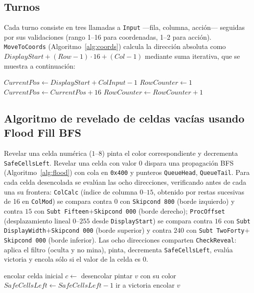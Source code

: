 \documentclass[conference]{IEEEtran}
\begin{document}
\subsection{Turnos}

Cada turno consiste en tres llamadas a \texttt{Input} ---fila, columna, acción--- seguidas por sus validaciones (rango 1--16 para coordenadas, 1--2 para acción). \texttt{MoveToCoords} (Algoritmo~\ref{alg:coords}) calcula la dirección absoluta como $DisplayStart + (Row-1) \cdot 16 + (Col-1)$ mediante suma iterativa, que se muestra a continuación:

\begin{algorithm}[H]
\caption{MoveToCoords: coordenadas $\rightarrow$ dirección}
\label{alg:coords}
\begin{algorithmic}[1]
\State $CurrentPos \gets DisplayStart + ColInput - 1$
\State $RowCounter \gets 1$
    \State $CurrentPos \gets CurrentPos + 16$
    \State $RowCounter \gets RowCounter + 1$
\EndWhile
\end{algorithmic}
\end{algorithm}

\subsection{Algoritmo de revelado de celdas vacías usando Flood Fill BFS}

Revelar una celda numérica ($1$--$8$) pinta el color correspondiente y decrementa \texttt{SafeCellsLeft}. Revelar una celda con valor $0$ dispara una propagación BFS (Algoritmo~\ref{alg:flood}) con cola en \texttt{0x400} y punteros \texttt{QueueHead}, \texttt{QueueTail}. Para cada celda desencolada se evalúan las ocho direcciones, verificando antes de cada una su frontera: \texttt{ColCalc} (índice de columna $0$--$15$, obtenido por restas sucesivas de 16 en \texttt{ColMod}) se compara contra $0$ con \texttt{Skipcond 800} (borde izquierdo) y contra $15$ con \texttt{Subt Fifteen}$+$\texttt{Skipcond 000} (borde derecho); \texttt{ProcOffset} (desplazamiento lineal $0$--$255$ desde \texttt{DisplayStart}) se compara contra $16$ con \texttt{Subt DisplayWidth}$+$\texttt{Skipcond 000} (borde superior) y contra $240$ con \texttt{Subt TwoForty}$+$\texttt{Skipcond 000} (borde inferior). Las ocho direcciones comparten \texttt{CheckReveal}: aplica el filtro (oculta y no mina), pinta, decrementa \texttt{SafeCellsLeft}, evalúa victoria y encola sólo si el valor de la celda es $0$.

\begin{algorithm}[H]
\caption{Flood Fill iterativo (BFS)}
\label{alg:flood}
\begin{algorithmic}[1]
\State encolar celda inicial
    \State $c \gets$ desencolar
            \State pintar $v$ con su color
            \State $SafeCellsLeft \gets SafeCellsLeft - 1$
             \State ir a victoria \EndIf
             \State encolar $v$ \EndIf
        \EndIf
    \EndFor
\EndWhile
\end{algorithmic}
\end{algorithm}
\end{document}
